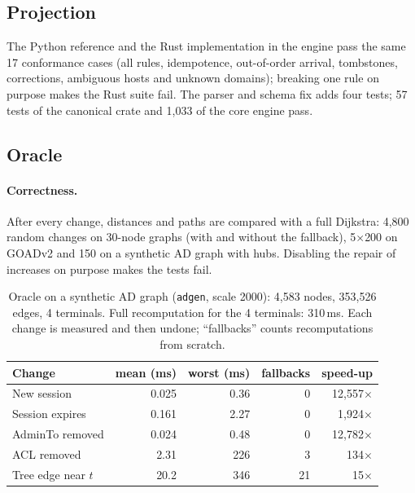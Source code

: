 \documentclass[10pt,twocolumn]{article}
\begin{document}
\subsection{Projection}

The Python reference and the Rust implementation in the engine pass the same 17
conformance cases (all rules, idempotence, out-of-order arrival, tombstones, corrections,
ambiguous hosts and unknown domains); breaking one rule on purpose makes the Rust suite fail. The parser and schema fix adds
four tests; 57 tests of the canonical crate and 1{,}033 of the core engine pass.

\subsection{Oracle}

\paragraph{Correctness.} After every change, distances and paths are compared with a full
Dijkstra: 4{,}800 random changes on 30-node graphs (with and without the fallback),
5$\times$200 on GOADv2 and 150 on a synthetic AD graph with hubs. Disabling the repair of
increases on purpose makes the tests fail.

\begin{table}[t]
\centering\small
\caption{Oracle on a synthetic AD graph (\texttt{adgen}, scale 2000): 4{,}583 nodes,
353{,}526 edges, 4 terminals. Full recomputation for the 4 terminals: 310\,ms. Each change
is measured and then undone; ``fallbacks'' counts recomputations from scratch.}
\label{tab:oracle}
\footnotesize\setlength{\tabcolsep}{4pt}
\begin{tabular}{@{}lrrrr@{}}
\toprule
Change & mean (ms) & worst (ms) & fallbacks & speed-up \\
\midrule
New session & 0.025 & 0.36 & 0 & 12{,}557$\times$ \\
Session expires & 0.161 & 2.27 & 0 & 1{,}924$\times$ \\
AdminTo removed & 0.024 & 0.48 & 0 & 12{,}782$\times$ \\
ACL removed & 2.31 & 226 & 3 & 134$\times$ \\
Tree edge near $t$ & 20.2 & 346 & 21 & 15$\times$ \\
\bottomrule
\end{tabular}
\end{table}
\end{document}

